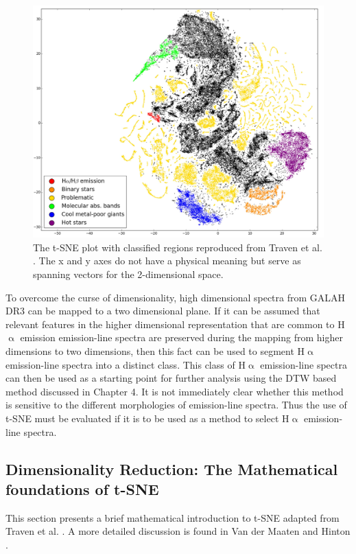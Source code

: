 \begin{figure}[!htb]
\centering
\includegraphics[scale=0.40]{figures/tsne traven.png}
\caption{The t-SNE plot with classified regions reproduced from Traven et al. \citep{traven2017galah}. The x and y axes do not have a physical meaning but serve as spanning vectors for the 2-dimensional space.}
\end{figure}

To overcome the curse of dimensionality, high dimensional spectra from GALAH DR3 can be mapped to a two dimensional plane. If it can be assumed that relevant features in the higher dimensional representation that are common to H$\upalpha$ emission emission-line spectra are preserved during the mapping from higher dimensions to two dimensions, then this fact can be used to segment H$\upalpha$ emission-line spectra into a distinct class. This class of H$\upalpha$ emission-line spectra can then be used as a starting point for further analysis using the DTW based method discussed in Chapter 4. It is not immediately clear whether this method is sensitive to the different morphologies of emission-line spectra. Thus the use of t-SNE must be evaluated if it is to be used as a method to select H$\upalpha$ emission-line spectra.

\subsection{Dimensionality Reduction: The Mathematical foundations of t-SNE}

This section presents a brief mathematical introduction to t-SNE adapted from Traven et al. \citep{traven2017galah}. A more detailed discussion is found in Van der Maaten and Hinton \citep{van2008visualizing}. 

